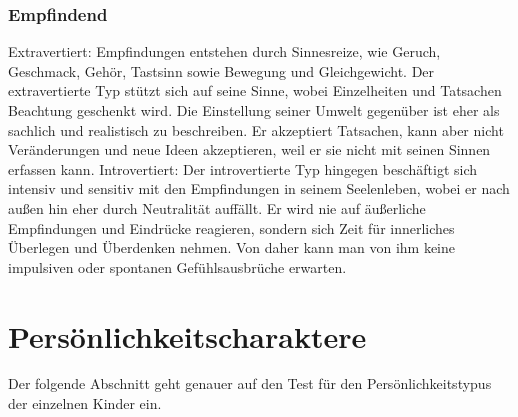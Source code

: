 \subsubsection{Empfindend}
Extravertiert: 
Empfindungen entstehen durch Sinnesreize, wie Geruch, Geschmack, Gehör, Tastsinn 
sowie Bewegung und Gleichgewicht. Der extravertierte Typ stützt sich auf seine 
Sinne, wobei Einzelheiten und Tatsachen Beachtung geschenkt wird. Die Einstellung seiner Umwelt gegenüber ist eher als sachlich und realistisch zu beschreiben. Er akzeptiert Tatsachen, kann aber nicht Veränderungen und neue Ideen akzeptieren, weil 
er sie nicht mit seinen Sinnen erfassen kann. 
Introvertiert: 
Der introvertierte Typ hingegen beschäftigt sich intensiv und sensitiv mit den Empfindungen in seinem Seelenleben, wobei er nach außen hin eher durch Neutralität auffällt. Er wird nie auf äußerliche Empfindungen und Eindrücke reagieren, sondern sich 
Zeit für innerliches Überlegen und Überdenken nehmen. Von daher kann man von 
ihm keine impulsiven oder spontanen Gefühlsausbrüche erwarten.




\section{Persönlichkeitscharaktere}

Der folgende Abschnitt geht genauer auf den Test für den Persönlichkeitstypus der einzelnen Kinder ein.

